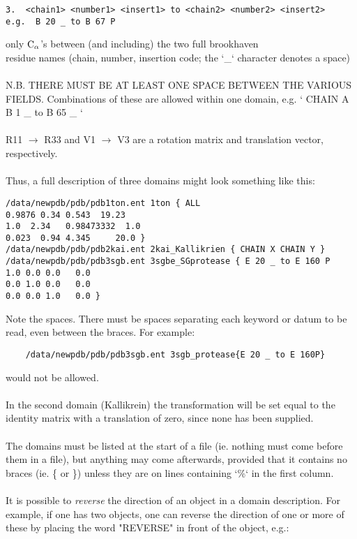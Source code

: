 \begin{scriptsize}\begin{verbatim}
3.  <chain1> <number1> <insert1> to <chain2> <number2> <insert2>
e.g.  B 20 _ to B 67 P 
\end{verbatim} \end{scriptsize}
only ${\rm C}_{\alpha}$'s between (and including) the two full brookhaven\\
residue names (chain, number, insertion code;
the `\_` character denotes a space)\\
\\
N.B. THERE MUST BE AT LEAST ONE SPACE BETWEEN THE VARIOUS FIELDS.
Combinations of these are allowed within one domain, e.g. `{ CHAIN A B 1 
\_ to B 65 \_ }`\\
\\
R11 $\rightarrow$ R33 and V1 $\rightarrow$ V3 are a rotation matrix and translation vector, respectively.\\
\\
Thus, a full description of three domains might look something
like this:\\

\begin{scriptsize}\begin{verbatim}
/data/newpdb/pdb/pdb1ton.ent 1ton { ALL 
0.9876 0.34 0.543  19.23
1.0  2.34   0.98473332  1.0
0.023  0.94 4.345     20.0 }
/data/newpdb/pdb/pdb2kai.ent 2kai_Kallikrien { CHAIN X CHAIN Y }
/data/newpdb/pdb/pdb3sgb.ent 3sgbe_SGprotease { E 20 _ to E 160 P 
1.0 0.0 0.0   0.0
0.0 1.0 0.0   0.0
0.0 0.0 1.0   0.0 }
\end{verbatim} \end{scriptsize}

Note the spaces.  There must be spaces separating each keyword or 
datum to be read, even between the braces.  For example:

\begin{scriptsize}
    \begin{verbatim}
    /data/newpdb/pdb/pdb3sgb.ent 3sgb_protease{E 20 _ to E 160P}
    \end{verbatim}\end{scriptsize}

    would not be allowed.\\
    \\
    In the second domain (Kallikrein) the transformation will be set equal
    to the identity matrix with a translation of zero, since none has been 
    supplied.\\
    \\
    The domains must be listed at the start of a file (ie. nothing must
    come before them in a file), but anything may come afterwards, 
    provided that it contains no braces (ie. \{ or \}) unless they are on lines 
    containing `\%` in the first column.\\
    \\
    It is possible to {\em reverse} the direction of an object in a domain
    description.  For example, if one has two objects,
    one can reverse the direction of one or more of these by placing the
    word "REVERSE" in front of the object, e.g.:

